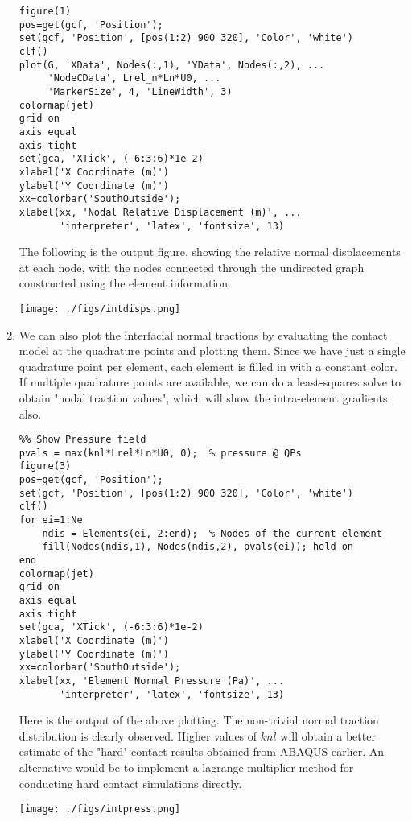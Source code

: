 \documentclass[11pt]{article}
\begin{document}
\begin{enumerate}
\begin{verbatim}
figure(1)
pos=get(gcf, 'Position');
set(gcf, 'Position', [pos(1:2) 900 320], 'Color', 'white')
clf()
plot(G, 'XData', Nodes(:,1), 'YData', Nodes(:,2), ...
     'NodeCData', Lrel_n*Ln*U0, ...
     'MarkerSize', 4, 'LineWidth', 3)
colormap(jet)
grid on
axis equal
axis tight
set(gca, 'XTick', (-6:3:6)*1e-2)
xlabel('X Coordinate (m)')
ylabel('Y Coordinate (m)')
xx=colorbar('SouthOutside');
xlabel(xx, 'Nodal Relative Displacement (m)', ...
       'interpreter', 'latex', 'fontsize', 13)
\end{verbatim}
The following is the output figure, showing the relative normal displacements at each node, with the nodes connected through the undirected graph constructed using the element information.
\begin{center}
\texttt{[image: ./figs/intdisps.png]}
\end{center}
\item We can also plot the interfacial normal tractions by evaluating the contact model at the quadrature points and plotting them.
Since we have just a single quadrature point per element, each element is filled in with a constant color.
If multiple quadrature points are available, we can do a least-squares solve to obtain "nodal traction values", which will show the intra-element gradients also.
\begin{verbatim}
%% Show Pressure field
pvals = max(knl*Lrel*Ln*U0, 0);  % pressure @ QPs
figure(3)
pos=get(gcf, 'Position');
set(gcf, 'Position', [pos(1:2) 900 320], 'Color', 'white')
clf()
for ei=1:Ne
    ndis = Elements(ei, 2:end);  % Nodes of the current element
    fill(Nodes(ndis,1), Nodes(ndis,2), pvals(ei)); hold on
end
colormap(jet)
grid on
axis equal
axis tight
set(gca, 'XTick', (-6:3:6)*1e-2)
xlabel('X Coordinate (m)')
ylabel('Y Coordinate (m)')
xx=colorbar('SouthOutside');
xlabel(xx, 'Element Normal Pressure (Pa)', ...
       'interpreter', 'latex', 'fontsize', 13)
\end{verbatim}
Here is the output of the above plotting.
The non-trivial normal traction distribution is clearly observed.
Higher values of \(knl\) will obtain a better estimate of the "hard" contact results obtained from ABAQUS earlier.
An alternative would be to implement a lagrange multiplier method for conducting hard contact simulations directly.
\begin{center}
\texttt{[image: ./figs/intpress.png]}
\end{center}
\end{enumerate}
\end{document}
